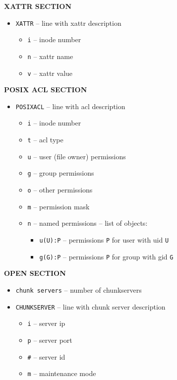 \documentclass[a4paper,11pt,english]{report}
\def\code#1{\texttt{#1}}
\begin{document}
				\textbf{XATTR SECTION}
				\begin{itemize}
					\item \code{XATTR}     -- line with xattr description
					\begin{itemize}
						\item \code{i}      -- inode number
						\item \code{n}      -- xattr name
						\item \code{v}      -- xattr value
					\end{itemize}
				\end{itemize}
				\bigskip
				
				\textbf{POSIX ACL SECTION}
				\begin{itemize}
					\item \code{POSIXACL}  -- line with acl description
					\begin{itemize}
						\item \code{i}      -- inode number
						\item \code{t}      -- acl type
						\item \code{u}      -- user (file owner) permissions
						\item \code{g}      -- group permissions
						\item \code{o}      -- other permissions
						\item \code{m}      -- permission mask
						\item \code{n}      -- named permissions -- list of objects:
						\begin{itemize}
							\item \code{u(U):P}  -- permissions \code{P} for user with uid \code{U}
							\item \code{g(G):P}  -- permissions \code{P} for group with gid \code{G}
						\end{itemize}
					\end{itemize}
				\end{itemize}
				\bigskip
				
				\textbf{OPEN SECTION}
				\begin{itemize}
					\item \code{chunk servers}       -- number of chunkservers
					\item \code{CHUNKSERVER}         -- line with chunk server description
					\begin{itemize}
						\item \code{i}      -- server ip
						\item \code{p}      -- server port
						\item \code{\#}     -- server id
						\item \code{m}      -- maintenance mode
					\end{itemize}
				\end{itemize}
				\bigskip
				
\end{document}
